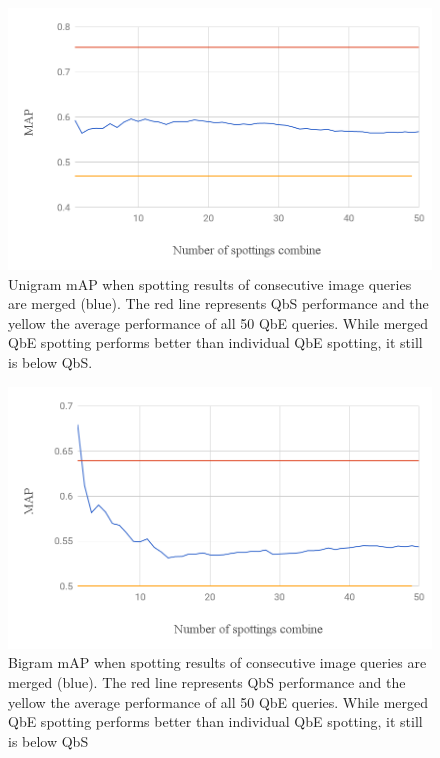\documentclass[ms,electronic,twosidetoc,letterpaper,chaptercenter,parttop,lof,lot]{byumsphd}
\begin{document}
\begin{figure}
    \centering
    \includegraphics[width=.75\textwidth]{unigram_respot_chart}
    \caption{Unigram mAP when spotting results of consecutive image queries are merged (blue). The red line represents QbS performance and the yellow the average performance of all 50 QbE queries. While merged QbE spotting performs better than individual QbE spotting, it still is below QbS.}
    \label{fig:unigram_respot}
\end{figure}
\begin{figure}
    \centering
    \includegraphics[width=.75\textwidth]{bigram_respot_chart}
    \caption{Bigram mAP when spotting results of consecutive image queries are merged (blue). The red line represents QbS performance and the yellow the average performance of all 50 QbE queries. While merged QbE spotting performs better than individual QbE spotting, it still is below QbS}
    \label{fig:bigram_respot}
\end{figure}
\end{document}
